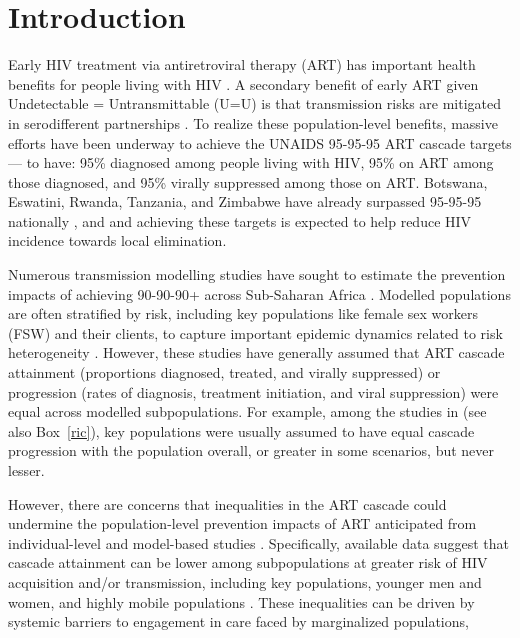 \section{Introduction}\label{art.intro} %
Early HIV treatment via antiretroviral therapy (ART) has important health benefits for people living with HIV \cite{Lundgren2015init}.
A secondary benefit of early ART given Undetectable = Untransmittable (U=U) is that
transmission risks are mitigated in serodifferent partnerships \cite{Cohen2016}.
To realize these population-level benefits, massive efforts have been underway to achieve
the UNAIDS 95-95-95 ART cascade targets \cite{UNAIDS2023} --- \ie to have:
95\% diagnosed among people living with HIV,
95\% on ART among those diagnosed, and
95\% virally suppressed among those on ART.
Botswana, Eswatini, Rwanda, Tanzania, and Zimbabwe
have already surpassed 95-95-95 nationally \cite{UNAIDS2023}, and
and achieving these targets is expected to help reduce HIV incidence towards local elimination.
\par
Numerous transmission modelling studies have sought to estimate
the prevention impacts of achieving 90-90-90+ across Sub-Saharan Africa
\cite{Eaton2012sys,Knight2022sr}.
Modelled populations are often stratified by risk,
including key populations like female sex workers (FSW) and their clients,
to capture important epidemic dynamics related to risk heterogeneity \cite{Watts2010}.
However, these studies have generally assumed that ART cascade
attainment (\ie proportions diagnosed, treated, and virally suppressed) or
progression (\ie rates of diagnosis, treatment initiation, and viral suppression)
were equal across modelled subpopulations.
For example, among the studies in \cite{Knight2022sr} (see also Box~\ref{ric}),
key populations were usually assumed to have
equal cascade progression with the population overall,
or greater in some scenarios, but never lesser.
\par
However, there are concerns that inequalities in the ART cascade
could undermine the population-level prevention impacts of ART
anticipated from individual-level and model-based studies
\cite{Baral2019,Green2020,Maheu-Giroux2024}.
Specifically, available data suggest that cascade attainment can be lower
among subpopulations at greater risk of HIV acquisition and/or transmission,
including key populations, younger men and women, and highly mobile populations
\cite{Hakim2018,Green2020}.
These inequalities can be driven by
systemic barriers to engagement in care faced by marginalized populations,
